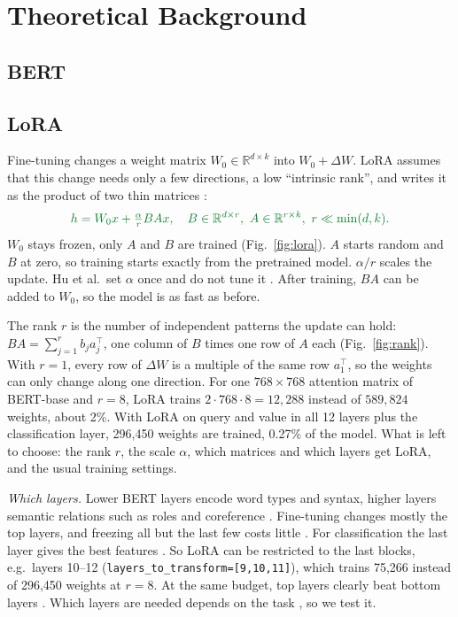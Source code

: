 \documentclass[conference]{IEEEtran}  %
\newcommand{\new}[1]{\textcolor{newgreen}{#1}}  %
\theoremstyle{plain}
\theoremstyle{definition}
\theoremstyle{remark}
\begin{document}
\section{Theoretical Background}
\label{sec:background}
\subsection{BERT}
\subsection{LoRA}
\new{Fine-tuning changes a weight matrix $W_0 \in \mathbb{R}^{d \times k}$ into $W_0 + \Delta W$.}
\new{LoRA assumes that this change needs only a few directions, a low ``intrinsic rank'', and writes it as the product of two thin matrices \cite{hu2022lora}:}
\begin{equation}
  \color{newgreen} h = W_0 x + \tfrac{\alpha}{r} B A x, \quad B \in \mathbb{R}^{d \times r},\ A \in \mathbb{R}^{r \times k},\ r \ll \min(d, k).
\end{equation}
\new{$W_0$ stays frozen, only $A$ and $B$ are trained (Fig.~\ref{fig:lora}).}
\new{$A$ starts random and $B$ at zero, so training starts exactly from the pretrained model.}
\new{$\alpha / r$ scales the update. Hu et al.\ set $\alpha$ once and do not tune it \cite[Sec.~4.1]{hu2022lora}.}
\new{After training, $BA$ can be added to $W_0$, so the model is as fast as before.}

\new{The rank $r$ is the number of independent patterns the update can hold: $BA = \sum_{j=1}^{r} b_j a_j^\top$, one column of $B$ times one row of $A$ each (Fig.~\ref{fig:rank}).}
\new{With $r = 1$, every row of $\Delta W$ is a multiple of the same row $a_1^\top$, so the weights can only change along one direction.}
\new{For one $768 \times 768$ attention matrix of BERT-base \cite{devlin2019bert} and $r = 8$, LoRA trains $2 \cdot 768 \cdot 8 = 12{,}288$ instead of $589{,}824$ weights, about 2\%.}
\new{With LoRA on query and value in all 12 layers plus the classification layer, 296,450 weights are trained, 0.27\% of the model.}
\new{What is left to choose: the rank $r$, the scale $\alpha$, which matrices and which layers get LoRA, and the usual training settings.}

\new{\textit{Which layers.} Lower BERT layers encode word types and syntax, higher layers semantic relations such as roles and coreference \cite[Sec.~4]{tenney2019pipeline}.}
\new{Fine-tuning changes mostly the top layers, and freezing all but the last few costs little \cite[Sec.~5]{merchant2020happens}.}
\new{For classification the last layer gives the best features \cite[Tab.~3]{sun2019finetune}.}
\new{So LoRA can be restricted to the last blocks, e.g.\ layers 10--12 (\texttt{layers\_to\_transform=[9,10,11]}), which trains 75,266 instead of 296,450 weights at $r = 8$.}
\new{At the same budget, top layers clearly beat bottom layers \cite[Fig.~1b]{zhang2023adalora}.}
\new{Which layers are needed depends on the task \cite{zuo2026layer}, so we test it.}
\end{document}

